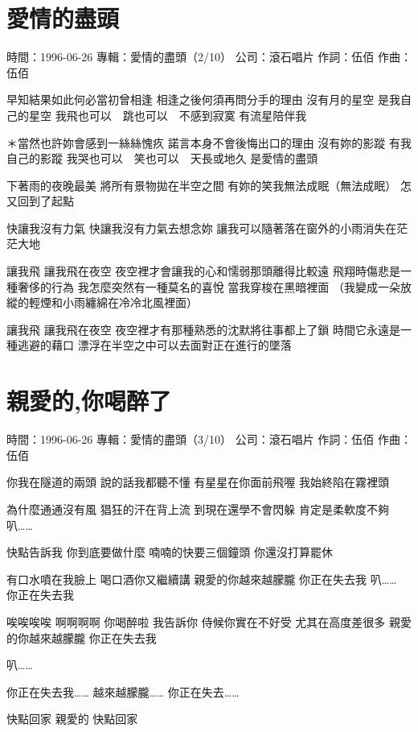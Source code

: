 \documentclass[UTF8,a4paper,oneside,twocolumn,12pt]{ctexbook}
\newcommand{\infopair}[2]{\textbullet #1：#2}
\newcommand{\zc}[1][伍佰]{\infopair{作詞}{#1}}
\newcommand{\zq}[1][伍佰]{\infopair{作曲}{#1}}
\newcommand{\zj}[1]{\infopair{專輯}{#1}}
\newcommand{\sj}[1]{\infopair{時間}{#1}}
\newcommand{\gs}[1]{\infopair{公司}{#1}}
\newenvironment{info}{\begin{flushleft}\kaishu
	}
	{\end{flushleft}\normalsize\yahei\par}
\newenvironment{lyric}{
	}
{}
\begin{document}
\section{愛情的盡頭}
\begin{info}
	\sj{1996-06-26}
	\zj{愛情的盡頭（2/10）}
	\gs{滾石唱片}
	\zc
	\zq
\end{info}
\begin{lyric}
	早知結果如此何必當初曾相逢
	相逢之後何須再問分手的理由
	沒有月的星空
	是我自己的星空
	我飛也可以　跳也可以　不感到寂寞
	有流星陪伴我

	＊當然也許妳會感到一絲絲愧疚
	諾言本身不會後悔出口的理由
	沒有妳的影蹤
	有我自己的影蹤
	我哭也可以　笑也可以　天長或地久
	是愛情的盡頭

	下著雨的夜晚最美
	將所有景物拋在半空之間
	有妳的笑我無法成眠（無法成眠）
	怎又回到了起點

	快讓我沒有力氣
	快讓我沒有力氣去想念妳
	讓我可以隨著落在窗外的小雨消失在茫茫大地

	讓我飛
	讓我飛在夜空
	夜空裡才會讓我的心和懦弱那頭離得比較遠
	飛翔時傷悲是一種奢侈的行為
	我怎麼突然有一種莫名的喜悅 當我穿梭在黑暗裡面
	（我變成一朵放縱的輕煙和小雨纏綿在冷冷北風裡面）

	讓我飛
	讓我飛在夜空
	夜空裡才有那種熟悉的沈默將往事都上了鎖
	時間它永遠是一種逃避的藉口
	漂浮在半空之中可以去面對正在進行的墜落
\end{lyric}

\section{親愛的,你喝醉了}
\begin{info}
	\sj{1996-06-26}
	\zj{愛情的盡頭（3/10）}
	\gs{滾石唱片}
	\zc
	\zq
\end{info}
\begin{lyric}
	你我在隧道的兩頭
	說的話我都聽不懂
	有星星在你面前飛喔
	我始終陷在霧裡頭

	為什麼通通沒有風
	猖狂的汗在背上流
	到現在還學不會閃躲
	肯定是柔軟度不夠
	叭……

	快點告訴我
	你到底要做什麼
	喃喃的快要三個鐘頭
	你還沒打算罷休

	有口水噴在我臉上
	喝口酒你又繼續講
	親愛的你越來越朦朧
	你正在失去我
	叭……
	你正在失去我

	唉唉唉唉
	啊啊啊啊
	你喝醉啦
	我告訴你
	侍候你實在不好受
	尤其在高度差很多
	親愛的你越來越朦朧
	你正在失去我

	叭……

	你正在失去我……
	越來越朦朧……
	你正在失去……

	快點回家 親愛的
	快點回家
\end{lyric}
\end{document}
